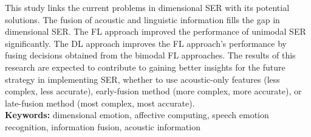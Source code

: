 This study links the current problems in dimensional SER with its potential
solutions. The fusion of acoustic and linguistic information fills the gap in
dimensional SER. The FL approach improved the performance of unimodal SER
significantly. The DL approach improves the FL approach's performance by fusing
decisions obtained from the bimodal FL approaches. The results of this research
are expected to contribute to gaining better insights for the future strategy in
implementing SER, whether to use acoustic-only features (less complex, less
accurate), early-fusion method (more complex, more accurate), or
late-fusion method (most complex, most accurate). \\

\noindent \textbf{Keywords:} dimensional emotion, affective computing, speech
emotion recognition, information fusion, acoustic information
